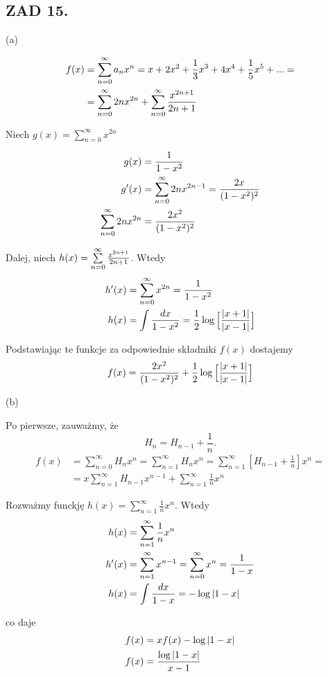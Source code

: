 \documentclass{article}[13pt]
\begin{document}
\subsection*{ZAD 15.}

{\color{acc}(a)}

\begin{align*}
    f(x)&=\sum\limits_{n=0}^\infty a_nx^n=x+2x^2+\frac13x^3+4x^4+\frac15x^5+...=\\
    &=\sum\limits_{n=0}^\infty 2nx^{2n}+\sum\limits_{n=0}^\infty{x^{2n+1}\over 2n+1}
\end{align*}

Niech $g(x)=\sum\limits_{n=0}^\infty x^{2n}$

\begin{align*}
    g(x)&={1\over 1-x^2}\\
    g'(x)&=\sum\limits_{n=0}^\infty 2nx^{2n-1}={2x\over(1-x^2)^2}\\
    \sum\limits_{n=0}^\infty 2nx^{2n}&={2x^2\over(1-x^2)^2}
\end{align*}

Dalej, niech $h(x)=\sum\limits_{n=0}^\infty {x^{2n+1}\over 2n+1}$. Wtedy
\begin{align*}
    h'(x)&=\sum\limits_{n=0}^\infty x^{2n}={1\over 1-x^2}\\
    h(x)&=\int{dx\over 1-x^2}=\frac12\log\Big[{|x+1|\over|x-1|}\Big]
\end{align*}

Podstawiając te funkcje za odpowiednie składniki $f(x)$ dostajemy
$$f(x)={2x^2\over(1-x^2)^2}+\frac12\log\Big[{|x+1|\over|x-1|}\Big]$$

{\color{acc}(b)}
\smallskip

Po pierwsze, zauważmy, że
$$H_n=H_{n-1}+\frac1n.$$
\begin{align*}
    f(x)&=\sum\limits_{n=0}^\infty H_nx^n=\sum\limits_{n=1}^\infty H_nx^n=\sum\limits_{n=1}^\infty [H_{n-1}+\frac 1n]x^n=\\
    &=x\sum\limits_{n=1}^\infty H_{n-1}x^{n-1}+\sum\limits_{n=1}^\infty \frac1nx^n 
\end{align*}

Rozważmy funckję $h(x)=\sum\limits_{n=1}^\infty\frac1nx^n$. Wtedy
\begin{align*}
    h(x)&=\sum\limits_{n=1}^\infty \frac1nx^n\\
    h'(x)&=\sum\limits_{n=1}^\infty x^{n-1}=\sum\limits_{n=0}^\infty x^n={1\over 1-x}\\
    h(x)&=\int{dx\over 1-x}=-\log|1-x|
\end{align*}

co daje
\begin{align*}
    f(x)&=xf(x)-\log|1-x|\\
    f(x)&={\log|1-x|\over x-1}
\end{align*}
\end{document}
